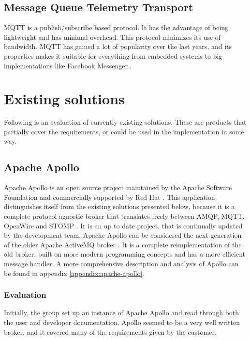 \subsection{Message Queue Telemetry Transport}
\label{subsec:prestudies-mqtt}
MQTT is a publish/subscribe based protocol. It has the advantage of being lightweight and has minimal overhead. This protocol minimizes its use of bandwidth. MQTT has gained a lot of popularity over the last years, and its properties makes it suitable for everything from embedded systems to big implementations like Facebook Messenger \cite{facebook-messenger}.

\section{Existing solutions}
\label{subsec:prestudies-existing_solutions}

Following is an evaluation of currently existing solutions. These are products that partially cover the requirements, or could be used in the implementation in some way.

\subsection{Apache Apollo}
\label{subsec:prestudies-existing_solutions-apache_apollo}

Apache Apollo \cite{apache-apollo} is an open source project maintained by the Apache Software Foundation \cite{apache} and commercially supported by Red Hat \cite{red-hat}. This application distinguishes itself from the existing solutions presented below, because it is a complete protocol agnostic broker that translates freely between AMQP, MQTT, OpenWire \cite{openwire} and STOMP \cite{stomp}. It is an up to date project, that is continually updated by the development team. Apache Apollo can be considered the next generation of the older Apache ActiveMQ broker \cite{activemq}. It is a complete reimplementation of the old broker, built on more modern programming concepts and has a more efficient message handler. A more comprehensive description and analysis of Apollo can be found in appendix \ref{appendix:apache-apollo}.

\subsubsection{Evaluation}
\label{subsec:prestudies-existing_solutions-apache_apollo-evaluation}

Initially, the group set up an instance of Apache Apollo and read through both the user and developer documentation. Apollo seemed to be a very well written broker, and it covered many of the requirements given by the customer.

